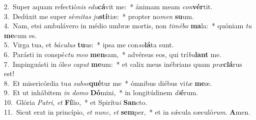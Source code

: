 {2.~}Super aquam refectió\textit{nis} \textit{e}\textit{du}\textbf{cá}vit me:~* ánimam meam \textit{con}\textbf{vér}tit.\\
{3.~}Dedúxit me super sé\textit{mi}\textit{tas} \textit{ju}\textbf{stí}tiæ:~* propter no\textit{men} \textbf{su}um.\\
{4.~}Nam, etsi ambulávero in médio umbræ mortis, non \textit{ti}\textit{mé}\textit{bo} \textbf{ma}la:~* quóniam \textit{tu} \textbf{me}cum es.\\
{5.~}Virga tua, et \textit{bá}\textit{cu}\textit{lus} \textbf{tu}us:~* ipsa me con\textit{so}\textbf{lá}ta sunt.\\
{6.~}Parásti in conspé\textit{ctu} \textit{me}\textit{o} \textbf{men}sam,~* advérsus eos, qui trí\textit{bu}\textbf{lant} me.\\
{7.~}Impinguásti in óle\textit{o} \textit{ca}\textit{put} \textbf{me}um:~* et calix meus inébrians quam \textit{præ}\textbf{clá}rus est!\\
{8.~}Et misericórdia tu\textit{a} \textit{sub}\textit{se}\textbf{qué}tur me~* ómnibus diébus vi\textit{tæ} \textbf{me}æ.\\
{9.~}Et ut inhábitem \textit{in} \textit{do}\textit{mo} \textbf{Dó}mini,~* in longitúdinem \textit{di}\textbf{é}rum.\\
{10.~}Glória \textit{Pa}\textit{tri}, \textit{et} \textbf{Fí}lio,~* et Spirítu\textit{i} \textbf{San}cto.\\
{11.~}Sicut erat in princípio, \textit{et} \textit{nunc}, \textit{et} \textbf{sem}per,~* et in sǽcula sæculó\textit{rum}. \textbf{A}men.\\
